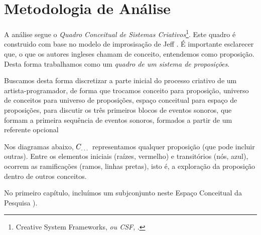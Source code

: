 \section{Metodologia de Análise}\label{sec:metodo}

A análise segue o \emph{Quadro Conceitual de Sistemas Criativos}\footnote{Creative System Frameworks, \emph{ou CSF}, .}. Este quadro é construido com base no modelo de improsisação de Jeff . É importante esclarecer que, o que os autores ingleses chamam de conceito, entendemos como proposição. Desta forma trabalhamos como um \emph{quadro de um sistema de proposições}. 

Buscamos desta forma discretizar a parte inicial do processo criativo de um artista-programador, de forma que trocamos conceito para proposição, universo de conceitos para universo de proposições, espaço conceitual para espaço de proposições, para discutir os três primeiros blocos de eventos sonoros, que formam a primeira sequência de eventos sonoros, formados a partir de um referente opcional


  
Nos diagramas abaixo, $C_\emph{\ldots}$ representamos qualquer proposição (que pode incluir outras). Entre os elementos iniciais (raízes, vermelho) e transitórios (nós, azul), ocorrem as ramificações (ramos, linhas pretas), isto é, a exploração da proposição dentro de outros conceitos.


No primeiro capítulo, incluímos um subjconjunto neste Espaço Conceitual da Pesquisa ). 


